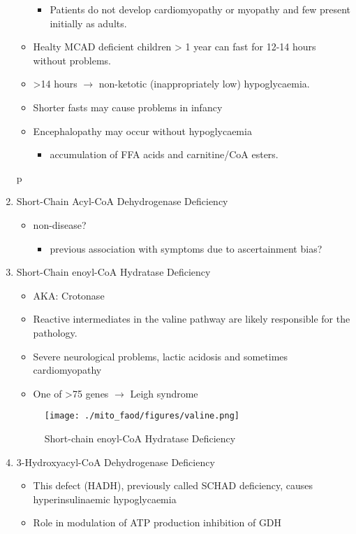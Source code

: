 \documentclass{scrartcl}
\begin{document}
\begin{enumerate}
\begin{itemize}
\begin{itemize}
\item Patients do not develop cardiomyopathy or myopathy and few present
initially as adults.
\end{itemize}
\item Healty MCAD deficient children > 1 year can fast for 12-14 hours without problems.
\item >14 hours \(\to\) non-ketotic (inappropriately low) hypoglycaemia.
\item Shorter fasts may cause problems in infancy
\item Encephalopathy may occur without hypoglycaemia
\begin{itemize}
\item accumulation of FFA acids and carnitine/CoA esters.
\end{itemize}
\end{itemize}
p
\item Short-Chain Acyl-CoA Dehydrogenase Deficiency
\label{sec:org91918aa}
\begin{itemize}
\item non-disease?
\begin{itemize}
\item previous association with symptoms due to ascertainment bias?
\end{itemize}
\end{itemize}

\item Short-Chain enoyl-CoA Hydratase Deficiency
\label{sec:org97cd378}
\begin{itemize}
\item AKA: Crotonase
\item Reactive intermediates in the valine pathway are likely responsible
for the pathology.
\item Severe neurological problems, lactic acidosis and sometimes
cardiomyopathy
\item One of >75 genes \(\to\) Leigh syndrome
\end{itemize}

\begin{figure}[htbp]
\centering
\texttt{[image: ./mito\_faod/figures/valine.png]}
\caption{\label{fig:org9876b41}
Short-chain enoyl-CoA Hydratase Deficiency}
\end{figure}

\item 3-Hydroxyacyl-CoA Dehydrogenase Deficiency
\label{sec:org03346ba}
\begin{itemize}
\item This defect (HADH), previously called SCHAD deficiency, causes
hyperinsulinaemic hypoglycaemia
\item Role in modulation of ATP production inhibition of GDH
\end{itemize}


\end{enumerate}
\end{document}
